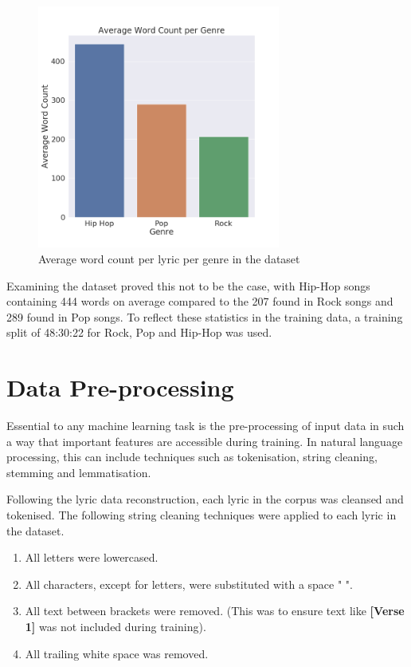 \begin{figure}[h]
	\includegraphics[width=8cm, height=8cm]{./figures/fig6}
	\centering
	\caption{Average word count per lyric per genre in the dataset}
	\label{fig:fig6}
\end{figure}

\noindent
\newline
Examining the dataset proved this not to be the case, with Hip-Hop songs containing 444 words on average compared to the 207 found in Rock songs and 289 found in Pop songs. To reflect these statistics in the training data, a training split of 48:30:22 for Rock, Pop and Hip-Hop was used.
\section{Data Pre-processing}
Essential to any machine learning task is the pre-processing of input data in such a way that important features are accessible during training. In natural language processing, this can include techniques such as tokenisation, string cleaning, stemming and lemmatisation. 

\noindent
\newline
Following the lyric data reconstruction, each lyric in the corpus was cleansed and tokenised. The following string cleaning techniques were applied to each lyric in the dataset.

\begin{enumerate}
	\item All letters were lowercased.
	\item All characters, except for letters, were substituted with a space " ".
	\item All text between brackets were removed. (This was to ensure text like \textbf{[Verse 1]} was not included during training).
	\item All trailing white space was removed.
\end{enumerate}

